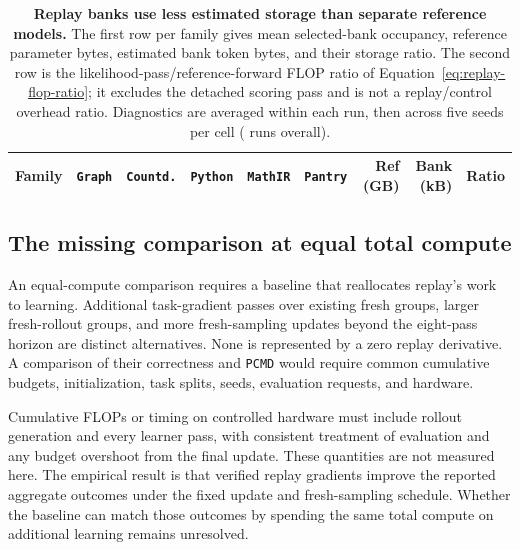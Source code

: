 \documentclass{article}
\newcommand{\1}{\mathbf 1}
\newcommand{\pmd}{\texttt{PCMD}}
\theoremstyle{remark}
\theoremstyle{definition}
\theoremstyle{plain}
\begin{document}
\begin{table}[t]
  \centering
  \caption{\textbf{Replay banks use less estimated storage than separate reference models.}
  The first row per family gives mean selected-bank occupancy, reference
  parameter bytes, estimated bank token bytes, and their storage ratio. The
  second row is the likelihood-pass/reference-forward FLOP ratio of
  Equation~\eqref{eq:replay-flop-ratio}; it excludes the detached scoring pass
  and is not a replay/control overhead ratio. Diagnostics are averaged within
  each run, then across five seeds per cell (\MDcostRuns{} runs overall).}
  \label{tab:replay-cost}
  \scriptsize
  \setlength{\tabcolsep}{4.2pt}
  \begin{tabular}{@{}lrrrrrrrr@{}}
    \toprule
    \textbf{Family} & \textbf{\texttt{Graph}} & \textbf{\texttt{Countd.}} & \textbf{\texttt{Python}}
      & \textbf{\texttt{MathIR}} & \textbf{\texttt{Pantry}} & \textbf{Ref (GB)}
      & \textbf{Bank (kB)} & \textbf{Ratio} \\
    \midrule
    
  \end{tabular}
\end{table}

\subsection{The missing comparison at equal total compute}
\label{app:compute-budget-control}

An equal-compute comparison requires a baseline that reallocates replay's
work to learning. Additional task-gradient passes over existing fresh groups,
larger fresh-rollout groups, and more fresh-sampling updates beyond the
eight-pass horizon are distinct alternatives. None is represented by a
zero replay derivative. A comparison of their correctness and \pmd{} would
require common cumulative budgets, initialization, task splits, seeds,
evaluation requests, and hardware.

Cumulative FLOPs or timing on controlled hardware must include rollout
generation and every learner pass, with consistent treatment of evaluation
and any budget overshoot from the final update. These quantities are not
measured here. The empirical result is that verified replay gradients improve
the reported aggregate outcomes under the fixed update and fresh-sampling
schedule. Whether the baseline can match those outcomes by spending the
same total compute on additional learning remains unresolved.
\end{document}
